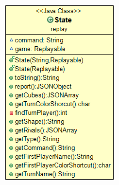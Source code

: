 \documentclass[../DocumentoOficial.tex]{subfiles}
\begin{document}
\begin{sprint}[5]
\begin{center}
\includegraphics[scale=0.5]{state-sprint5.png}
\end{center}

\end{sprint}
\end{document}
